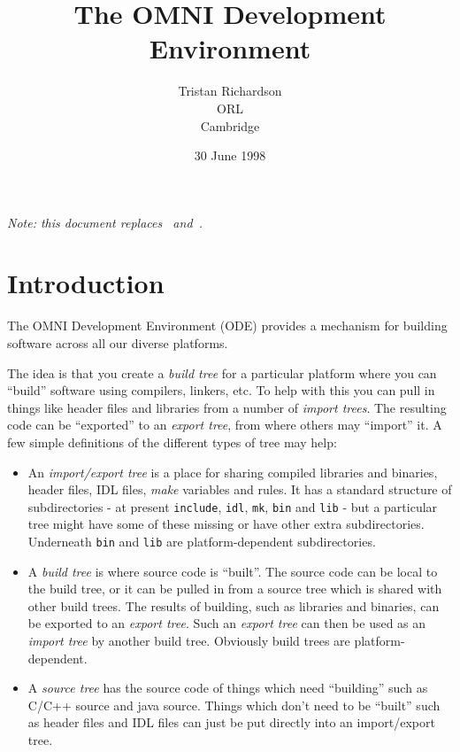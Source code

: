 \documentclass[11pt,twoside,onecolumn]{article}
\title{The OMNI Development Environment}
\author{Tristan Richardson\\
        ORL\\
        Cambridge}
\date{30 June 1998}
\begin{document}
\maketitle

\begin{center}
{\it Note: this document replaces~\cite{lo95} and~\cite{ward95}.}

\end{center}

\vspace{0.2in}

\tableofcontents

\newpage

\section{Introduction}

The OMNI Development Environment (ODE) provides a mechanism for building
software across all our diverse platforms.

The idea is that you create a {\em build tree} for a particular platform where
you can ``build'' software using compilers, linkers, etc.  To help with this
you can pull in things like header files and libraries from a number of {\em
import trees}.  The resulting code can be ``exported'' to an {\em export tree},
from where others may ``import'' it.  A few simple definitions of the different
types of tree may help:

\begin{itemize}

\item An {\em import/export tree} is a place for sharing compiled libraries and
binaries, header files, IDL files, {\em make} variables and rules.  It has a
standard structure of subdirectories - at present {\tt include}, {\tt idl},
{\tt mk}, {\tt bin} and {\tt lib} - but a particular tree might have some of
these missing or have other extra subdirectories.  Underneath {\tt bin} and
{\tt lib} are platform-dependent subdirectories.

\item A {\em build tree} is where source code is ``built''.  The source code
can be local to the build tree, or it can be pulled in from a source tree which
is shared with other build trees.  The results of building, such as libraries
and binaries, can be exported to an {\em export tree}.  Such an {\em export
tree} can then be used as an {\em import tree} by another build tree.
Obviously build trees are platform-dependent.

\item A {\em source tree} has the source code of things which need ``building''
such as C/C++ source and java source.  Things which don't need to be ``built''
such as header files and IDL files can just be put directly into an
import/export tree.

\end{itemize}
\end{document}
